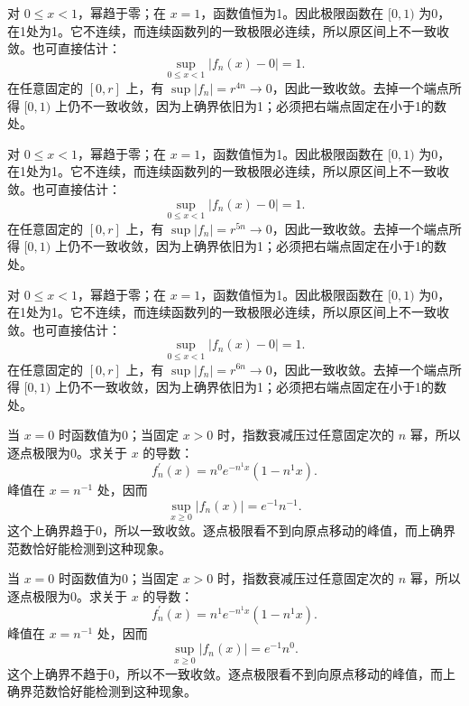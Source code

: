 \documentclass[UTF8,12pt,a4paper,fontset=fandol]{ctexart}
\begin{document}
\begin{solve}\label{ans:c28q4}
对 $0\le x<1$，幂趋于零；在 $x=1$，函数值恒为1。因此极限函数在 $[0,1)$ 为0，在1处为1。它不连续，而连续函数列的一致极限必连续，所以原区间上不一致收敛。也可直接估计：
\[
\sup_{0\le x<1}|f_n(x)-0|=1.
\]
在任意固定的 $[0,r]$ 上，有 $\sup|f_n|=r^{4n}\to0$，因此一致收敛。去掉一个端点所得 $[0,1)$ 上仍不一致收敛，因为上确界依旧为1；必须把右端点固定在小于1的数处。
\end{solve}

\begin{solve}\label{ans:c28q5}
对 $0\le x<1$，幂趋于零；在 $x=1$，函数值恒为1。因此极限函数在 $[0,1)$ 为0，在1处为1。它不连续，而连续函数列的一致极限必连续，所以原区间上不一致收敛。也可直接估计：
\[
\sup_{0\le x<1}|f_n(x)-0|=1.
\]
在任意固定的 $[0,r]$ 上，有 $\sup|f_n|=r^{5n}\to0$，因此一致收敛。去掉一个端点所得 $[0,1)$ 上仍不一致收敛，因为上确界依旧为1；必须把右端点固定在小于1的数处。
\end{solve}

\begin{solve}\label{ans:c28q6}
对 $0\le x<1$，幂趋于零；在 $x=1$，函数值恒为1。因此极限函数在 $[0,1)$ 为0，在1处为1。它不连续，而连续函数列的一致极限必连续，所以原区间上不一致收敛。也可直接估计：
\[
\sup_{0\le x<1}|f_n(x)-0|=1.
\]
在任意固定的 $[0,r]$ 上，有 $\sup|f_n|=r^{6n}\to0$，因此一致收敛。去掉一个端点所得 $[0,1)$ 上仍不一致收敛，因为上确界依旧为1；必须把右端点固定在小于1的数处。
\end{solve}

\begin{solve}\label{ans:c28q7}
当 $x=0$ 时函数值为0；当固定 $x>0$ 时，指数衰减压过任意固定次的 $n$ 幂，所以逐点极限为0。求关于 $x$ 的导数：
\[
f_n^{\prime}(x)=n^{0}e^{-n^{1}x}(1-n^{1}x).
\]
峰值在 $x=n^{-1}$ 处，因而
\[
\sup_{x\ge0}|f_n(x)|=e^{-1}n^{-1}.
\]
这个上确界趋于0，所以一致收敛。逐点极限看不到向原点移动的峰值，而上确界范数恰好能检测到这种现象。
\end{solve}

\begin{solve}\label{ans:c28q8}
当 $x=0$ 时函数值为0；当固定 $x>0$ 时，指数衰减压过任意固定次的 $n$ 幂，所以逐点极限为0。求关于 $x$ 的导数：
\[
f_n^{\prime}(x)=n^{1}e^{-n^{1}x}(1-n^{1}x).
\]
峰值在 $x=n^{-1}$ 处，因而
\[
\sup_{x\ge0}|f_n(x)|=e^{-1}n^{0}.
\]
这个上确界不趋于0，所以不一致收敛。逐点极限看不到向原点移动的峰值，而上确界范数恰好能检测到这种现象。
\end{solve}
\end{document}
